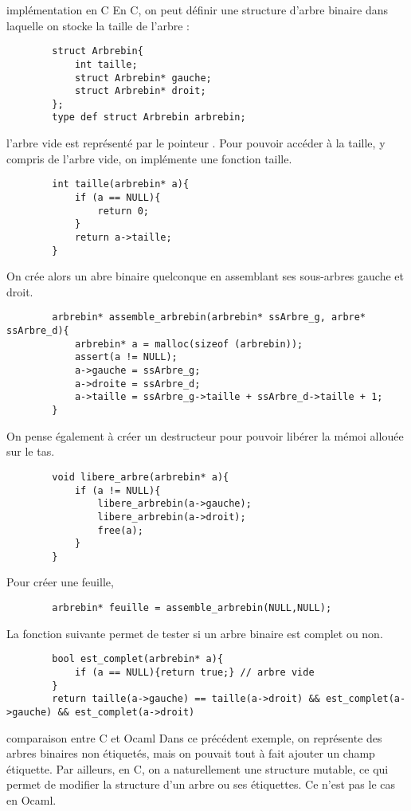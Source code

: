 \begin{exemple}{7.11}{implémentation en C}
    En C, on peut définir une structure d'arbre binaire dans laquelle on stocke la taille de l'arbre :
    \begin{verbatim}
        struct Arbrebin{
            int taille;
            struct Arbrebin* gauche;
            struct Arbrebin* droit;
        };
        type def struct Arbrebin arbrebin;
    \end{verbatim}
    l'arbre vide est représenté par le pointeur . Pour pouvoir accéder à la taille, y compris de l'arbre vide, on implémente une fonction taille.
    \begin{verbatim}
        int taille(arbrebin* a){
            if (a == NULL){
                return 0;
            }
            return a->taille;
        }
    \end{verbatim}
    On crée alors un abre binaire quelconque en assemblant ses sous-arbres gauche et droit. 
    \begin{verbatim}
        arbrebin* assemble_arbrebin(arbrebin* ssArbre_g, arbre* ssArbre_d){
            arbrebin* a = malloc(sizeof (arbrebin));
            assert(a != NULL);
            a->gauche = ssArbre_g;
            a->droite = ssArbre_d;
            a->taille = ssArbre_g->taille + ssArbre_d->taille + 1;
        }
    \end{verbatim}
    On pense également à créer un destructeur pour pouvoir libérer la mémoi allouée sur le tas. 
    \begin{verbatim}
        void libere_arbre(arbrebin* a){
            if (a != NULL){
                libere_arbrebin(a->gauche);
                libere_arbrebin(a->droit);
                free(a);
            }
        }
    \end{verbatim}
    Pour créer une feuille,
    \begin{verbatim}
        arbrebin* feuille = assemble_arbrebin(NULL,NULL);
    \end{verbatim}
    La fonction suivante permet de tester si un arbre binaire est complet ou non.
    \begin{verbatim}
        bool est_complet(arbrebin* a){
            if (a == NULL){return true;} // arbre vide
        }
        return taille(a->gauche) == taille(a->droit) && est_complet(a->gauche) && est_complet(a->droit)
    \end{verbatim}
\end{exemple}

\begin{remarque}{7.12}{comparaison entre C et Ocaml}
    Dans ce précédent exemple, on représente des arbres binaires non étiquetés, mais on pouvait tout à fait ajouter un champ étiquette. Par ailleurs, en C, on a naturellement une structure mutable, ce qui permet de modifier la structure d'un arbre ou ses étiquettes. Ce n'est pas le cas en Ocaml.
\end{remarque}

